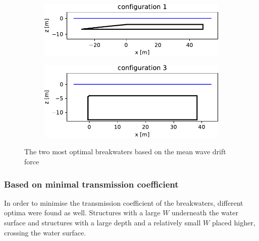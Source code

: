 \begin{figure}[h]
    \centering
    \begin{subfigure}[b]{0.49\textwidth}
        \centering
        \includegraphics[width=\textwidth]{figures/ComFLOW/Breakwater Geometries/DI1 moving/optima_Fd/breakwater_geometry1.pdf}
        \caption[]%
        {{\small}}    
        \label{fig: opt breakwater 1 moving fd}
    \end{subfigure}
    \hfill
    \begin{subfigure}[b]{0.49\textwidth}  
        \centering 
        \includegraphics[width=\textwidth]{figures/ComFLOW/Breakwater Geometries/DI1 moving/optima_Fd/breakwater_geometry3.pdf}
        \caption[]%
        {{\small}}    
        \label{fig: opt breakwater 3 moving fd}
    \end{subfigure}
    
    \caption{The two most optimal breakwaters based on the mean wave drift force}
    \label{fig: two most optimal breakwaters moving fd}
\end{figure}





\subsubsection{Based on minimal transmission coefficient}

In order to minimise the transmission coefficient of the breakwaters, different optima were found as well. Structures with a large $W$ underneath the water surface and structures with a large depth and a relatively small $W$ placed higher, crossing the water surface.  

